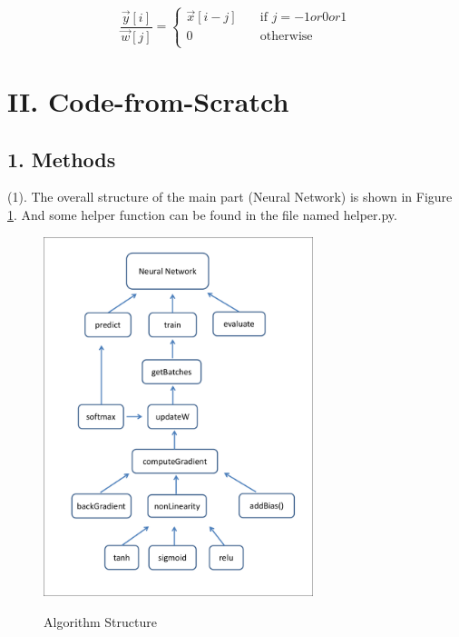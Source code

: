 \begin{description}
\begin{equation}
	\frac{\vec{y}[i]}{\vec{w}[j]} =
	\begin{cases}
			\vec{x}[i-j]	& 	\quad \text{if } j = -1 or 0 or 1 \\
			0				& 	\quad \text{otherwise} \\
		\end{cases}
\end{equation}
\end{description}

\newpage
\section*{\Large II. Code-from-Scratch}

\subsection*{\large 1. Methods}

(1). The overall structure of the main part (Neural Network) is shown in Figure \ref{fig:structure}. And some helper function can be found in the file named helper.py.

\begin{figure}[H]
\centering
\includegraphics[width=0.7\textwidth]{./figures/ECE544hw2.pdf}\
\caption{\label{fig:structure} Algorithm Structure}
\end{figure}

